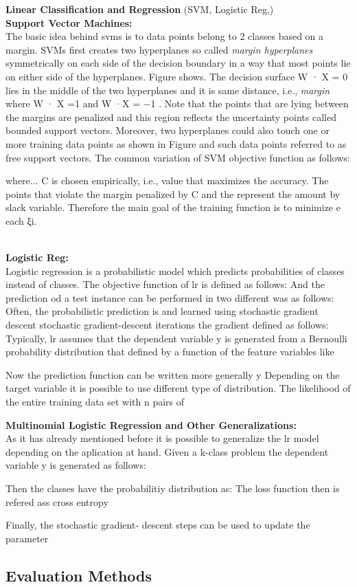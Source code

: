 \textbf{Linear Classification and Regression} (SVM, Logistic Reg,)\\
\textbf{Support Vector Machines:}\\
The basic idea behind svms is to data points belong to 2 classes based on a margin. SVMs first creates two hyperplanes so called \textit{margin hyperplanes} symmetrically on each side of the decision boundary in a way that most points lie on either side of the hyperplanes. Figure shows. 
The decision surface W · X = 0 lies in the middle of the two hyperplanes and it is same distance, i.e., \textit{margin} where W · X =1 and W ·X = −1 . Note that the points that are lying between the margins are penalized and this region reflects the uncertainty points called bounded support vectors. Moreover, two hyperplanes could also touch one or more training data points as shown in Figure and such data points referred to as free support vectors.
The common variation of SVM objective function as follows:

where...
C is chosen empirically, i.e.,  value that maximizes the accuracy. The points that violate the margin penalized by C and the represent the amount by slack variable. Therefore the main goal of the training function is to minimize  e each ξi. 


\\
\textbf{Logistic Reg:}\\
Logistic regression is a probabilistic model which predicts probabilities of classes instead of classes.
The objective function of lr is defined as follows:
And the prediction od a test instance can be performed in two different was as follows:
Often, the probabilistic prediction is and  learned using stochastic gradient descent
stochastic gradient-descent iterations the gradient defined as follows:
Typically, lr assumes that the dependent variable y is generated from a Bernoulli probability distribution that defined by a function of the feature variables like 

Now the prediction function can be written more generally y
Depending on the target variable it is possible to use different type of distribution.
The likelihood of the entire training data set with n pairs of

\textbf{Multinomial Logistic Regression and Other Generalizations:}\\
As it has already mentioned before it is possible to generalize the lr model depending on the aplication at hand. Given a k-class problem the dependent variable y is generated as follows:

Then the classes have the probabilitiy distribution as:
The loss function then is
refered ass cross entropy

Finally, the stochastic gradient- descent steps can be used to update the parameter


\subsection{Evaluation Methods}


